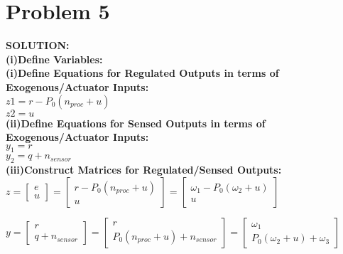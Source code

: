 \documentclass[10pt,a4paper]{article}
\begin{document}
\section{Problem 5}
\begin{tcolorbox}
\textbf{SOLUTION:}\\
\textbf{(i)Define Variables:} \\

\textbf{(i)Define Equations for Regulated Outputs in terms of Exogenous/Actuator Inputs:} \\
$z1= r-P_0(n_{proc}+u)$\\
$z2=u$\\

\textbf{(ii)Define Equations for Sensed Outputs in terms of Exogenous/Actuator Inputs:} \\
$y_1=r$\\
$y_2 = q+n_{sensor}$\\

\textbf{(iii)Construct Matrices for Regulated/Sensed Outputs:} \\
$z=\begin{bmatrix}
e\\
u
\end{bmatrix}=\begin{bmatrix}
r-P_0(n_{proc}+u)
\\u
\end{bmatrix}=\begin{bmatrix}
\omega_1-P_0(\omega_2+u) \\
 u
\end{bmatrix}$

$y=\begin{bmatrix}
r\\
q+n_{sensor}
\end{bmatrix}=\begin{bmatrix}
r\\
P_0(n_{proc}+u)+n_{sensor}
\end{bmatrix}=\begin{bmatrix}
\omega_1 \\
P_0(\omega_2+u)+\omega_3
\end{bmatrix}$\\


\end{tcolorbox}
\end{document}
